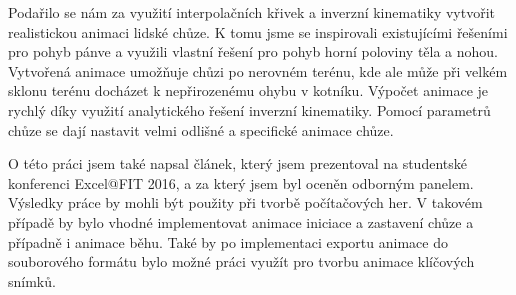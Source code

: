 Podařilo se nám za využití interpolačních křivek a inverzní kinematiky vytvořit realistickou animaci lidské chůze. K tomu jsme se inspirovali existujícími řešeními pro pohyb pánve a využili vlastní řešení pro pohyb horní poloviny těla a nohou. Vytvořená animace umožňuje chůzi po nerovném terénu, kde ale může při velkém sklonu terénu docházet k nepřirozenému ohybu v kotníku. Výpočet animace je rychlý díky využití analytického řešení inverzní kinematiky. Pomocí parametrů chůze se dají nastavit velmi odlišné a specifické animace chůze.

O této práci jsem také napsal článek, který jsem prezentoval na studentské konferenci Excel@FIT 2016, a za který jsem byl oceněn odborným panelem. Výsledky práce by mohli být použity při tvorbě počítačových her. V takovém případě by bylo vhodné implementovat animace iniciace a zastavení chůze a případně i animace běhu. Také by po implementaci exportu animace do souborového formátu bylo možné práci využít pro tvorbu animace klíčových snímků.

